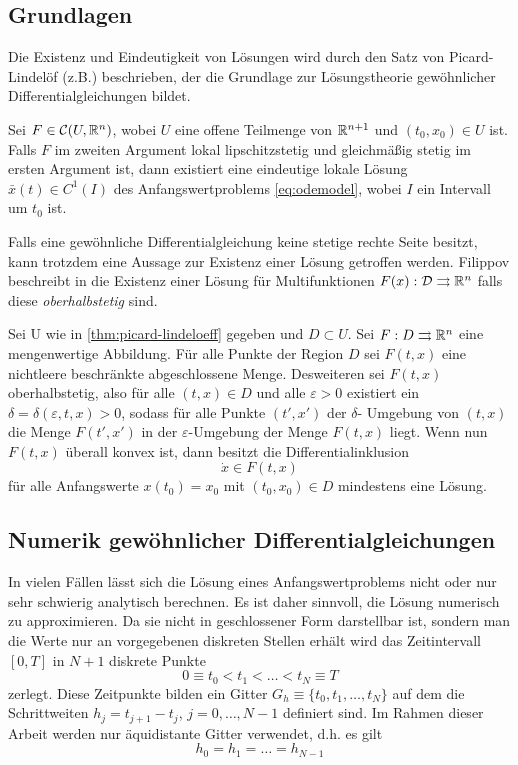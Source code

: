 \subsection{Grundlagen}
Die Existenz und Eindeutigkeit von Lösungen wird durch den Satz von Picard-Lindelöf (z.B.\cite{teschl2012ordinary}) beschrieben, der die Grundlage zur Lösungstheorie gewöhnlicher Differentialgleichungen bildet.
\begin{theorem}
\label{thm:picard-lindeloeff}
 Sei $F\in \mathcal{C}(U,\mathbb{R}^n)$, wobei $U$ eine offene Teilmenge von $\mathbb{R}^{n+1}$ und $(t_0,x_0)\in U$ ist. Falls $F$ im zweiten Argument lokal lipschitzstetig und gleichmäßig stetig im ersten Argument ist, dann existiert eine eindeutige lokale Lösung $\bar x(t)\in C^1(I)$ des Anfangswertproblems \eqref{eq:odemodel}, wobei $I$ ein Intervall um $t_0$ ist.
\end{theorem}
% 


Falls eine gewöhnliche Differentialgleichung keine stetige rechte Seite besitzt, kann trotzdem eine Aussage zur Existenz einer Lösung getroffen werden. Filippov beschreibt in \cite{filippov1971existence} die Existenz einer Lösung für Multifunktionen $F(x):\mathcal D \rightrightarrows \mathbb{R}^n$ falls diese  \textit{oberhalbstetig} sind. 
\begin{theorem}[Filippov]
 Sei U wie in \ref{thm:picard-lindeloeff} gegeben und $D\subset U$. Sei $F:D\rightrightarrows \mathbb{R}^n$ eine mengenwertige Abbildung. Für alle Punkte der Region $D$ sei $F(t,x)$ eine nichtleere beschränkte abgeschlossene Menge. Desweiteren sei $F(t,x)$ oberhalbstetig, also für alle $(t,x)\in D$ und alle $\varepsilon>0$ existiert ein $\delta = \delta(\varepsilon,t,x)>0$, sodass für alle Punkte $(t',x')$ der $\delta$- Umgebung von $(t,x)$ die Menge $F(t',x')$ in der $\varepsilon$-Umgebung der Menge $F(t,x)$ liegt.
 Wenn nun $F(t,x)$ überall konvex ist, dann besitzt die Differentialinklusion
 \[
  \dot x \in F(t,x)
 \]
 für alle Anfangswerte $x(t_0)=x_0$ mit $(t_0,x_0)\in D$ mindestens eine Lösung.
\end{theorem}


\subsection{Numerik gewöhnlicher Differentialgleichungen}
In vielen Fällen lässt sich die Lösung eines Anfangswertproblems nicht oder nur sehr schwierig analytisch berechnen. Es ist daher sinnvoll, die Lösung numerisch zu approximieren. Da sie nicht in geschlossener Form darstellbar ist, sondern man die Werte nur an vorgegebenen diskreten Stellen erhält wird das Zeitintervall $[0,T]$ in $N+1$ diskrete Punkte
\[
 0\equiv t_0<t_1<\ldots < t_N \equiv T
\]
zerlegt. Diese Zeitpunkte bilden ein Gitter $G_h \equiv \lbrace t_0,t_1,\ldots, t_N\rbrace $ auf dem die Schrittweiten $h_j= t_{j+1}-t_j$, $j=0,\ldots, N-1$ definiert sind. Im Rahmen dieser Arbeit werden nur äquidistante Gitter verwendet, d.h. es gilt 
\[
h_0=h_1 = \ldots = h_{N-1} 
\]
 
